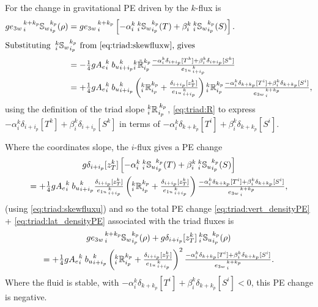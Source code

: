 \documentclass[NEMO_book]{subfiles}
\begin{document}
For the change in gravitational PE driven by the $k$-flux is
\begin{align}
  \label{eq:triad:vert_densityPE}
  g {e_{3w}}_{\,i}^{\,k+k_p}{\mathbb{S}_w}_{i_p}^{k_p} (\rho)
  &=g {e_{3w}}_{\,i}^{\,k+k_p}\left[-\alpha _i^k {\:}_i^k
    {\mathbb{S}_w}_{i_p}^{k_p} (T) + \beta_i^k {\:}_i^k
    {\mathbb{S}_w}_{i_p}^{k_p} (S) \right]. \notag \\
\intertext{Substituting  ${\:}_i^k {\mathbb{S}_w}_{i_p}^{k_p}$ from
  \eqref{eq:triad:skewfluxw}, gives}
 &=-\textstyle\frac{1}{4} g{A_e}_i^k{\: }{b_u}_{i+i_p}^k {_i^k\tilde{\mathbb{R}}_{i_p}^{k_p}}
\frac{ -\alpha _i^k\delta_{i+ i_p}[T^k]+ \beta_i^k\delta_{i+ i_p}[S^k]} { {e_{1u}}_{\,i + i_p}^{\,k} } \notag \\
 &=+\textstyle\frac{1}{4} g{A_e}_i^k{\: }{b_u}_{i+i_p}^k
     \left({_i^k\mathbb{R}_{i_p}^{k_p}}+\frac{\delta_{i+i_p}[z_T^k]}{{e_{1u}}_{\,i + i_p}^{\,k}}\right) {_i^k\mathbb{R}_{i_p}^{k_p}}
\frac{-\alpha_i^k \delta_{k+ k_p}[T^i]+ \beta_i^k\delta_{k+ k_p}[S^i]} {{e_{3w}}_{\,i}^{\,k+k_p}},
\end{align}
using the definition of the triad slope ${}_{i}^{k}{\mathbb{R}_{}}_{i_p}^{\,k_p}$,
\eqref{eq:triad:R} to express $-\alpha _i^k\delta_{i+ i_p}[T^k]+
\beta_i^k\delta_{i+ i_p}[S^k]$ in terms of  $-\alpha_i^k \delta_{k+
  k_p}[T^i]+ \beta_i^k\delta_{k+ k_p}[S^i]$.

Where the coordinates slope, the $i$-flux gives a PE change
\begin{multline}
  \label{eq:triad:lat_densityPE}
 g \delta_{i+i_p}[z_T^k]
\left[
-\alpha _i^k {\:}_i^k {\mathbb{S}_u}_{i_p}^{k_p} (T) + \beta_i^k {\:}_i^k {\mathbb{S}_u}_{i_p}^{k_p} (S)
\right] \\
= +\textstyle\frac{1}{4} g{A_e}_i^k{\: }{b_u}_{i+i_p}^k
     \frac{\delta_{i+i_p}[z_T^k]}{{e_{1u}}_{\,i + i_p}^{\,k}}
\left({_i^k\mathbb{R}_{i_p}^{k_p}}+\frac{\delta_{i+i_p}[z_T^k]}{{e_{1u}}_{\,i + i_p}^{\,k}}\right)
\frac{-\alpha_i^k \delta_{k+ k_p}[T^i]+ \beta_i^k\delta_{k+ k_p}[S^i]} {{e_{3w}}_{\,i}^{\,k+k_p}},
\end{multline}
(using \eqref{eq:triad:skewfluxu}) and so the total PE change
\eqref{eq:triad:vert_densityPE} + \eqref{eq:triad:lat_densityPE} associated with the triad fluxes is
\begin{multline}
  \label{eq:triad:tot_densityPE}
  g{e_{3w}}_{\,i}^{\,k+k_p}{\mathbb{S}_w}_{i_p}^{k_p} (\rho) +
g\delta_{i+i_p}[z_T^k] {\:}_i^k {\mathbb{S}_u}_{i_p}^{k_p} (\rho) \\
= +\textstyle\frac{1}{4} g{A_e}_i^k{\: }{b_u}_{i+i_p}^k
     \left({_i^k\mathbb{R}_{i_p}^{k_p}}+\frac{\delta_{i+i_p}[z_T^k]}{{e_{1u}}_{\,i + i_p}^{\,k}}\right)^2
\frac{-\alpha_i^k \delta_{k+ k_p}[T^i]+ \beta_i^k\delta_{k+ k_p}[S^i]} {{e_{3w}}_{\,i}^{\,k+k_p}}.
\end{multline}
Where the fluid is stable, with $-\alpha_i^k \delta_{k+ k_p}[T^i]+
\beta_i^k\delta_{k+ k_p}[S^i]<0$, this PE change is negative.
\end{document}
